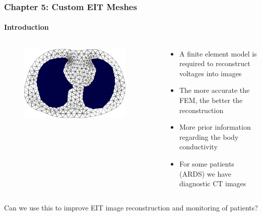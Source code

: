\documentclass[10pt,    %
    english,            %
    xcolor=table,       %
    envcountsect,        %
    aspectratio=1610
]{beamer}
\begin{document}
\begin{frame}
	\frametitle{Chapter 5: Custom EIT Meshes}
	\framesubtitle{Introduction}    
	\begin{columns}[c]
		\begin{column}{0.5\textwidth}
			\begin{figure}[H]
				\centering
				\includegraphics[width=0.9\textwidth]{human_mesh_lungs.png}
			\end{figure}
		\end{column}
		\begin{column}{0.5\textwidth}
			\begin{itemize}
				\item A finite element model is required to reconstruct voltages into images
				\item The more accurate the FEM, the better the reconstruction
				\item More prior information regarding the body conductivity
				\item For some patients (ARDS) we have diagnostic CT images 
			\end{itemize}
		\end{column}
	\end{columns}%
	\vspace{8mm}
\alert{Can we use this to improve EIT image reconstruction and monitoring of patients?}
\end{frame}

\end{document}
